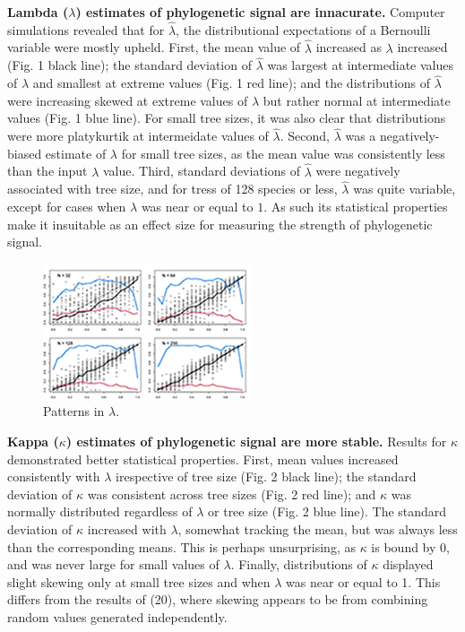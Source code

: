 \documentclass[9pt,twocolumn,twoside,lineno]{pnas-new}
\begin{document}
\textbf{Lambda (\(\lambda\)) estimates of phylogenetic signal are
innacurate.} Computer simulations revealed that for \(\hat{\lambda}\),
the distributional expectations of a Bernoulli variable were mostly
upheld. First, the mean value of \(\hat{\lambda}\) increased as
\(\lambda\) increased (Fig. 1 black line); the standard deviation of
\(\hat{\lambda}\) was largest at intermediate values of \(\lambda\) and
smallest at extreme values (Fig. 1 red line); and the distributions of
\(\hat{\lambda}\) were increasing skewed at extreme values of
\(\lambda\) but rather normal at intermediate values (Fig. 1 blue line).
For small tree sizes, it was also clear that distributions were more
platykurtik at intermeidate values of \(\hat{\lambda}\). Second,
\(\hat{\lambda}\) was a negatively-biased estimate of \(\lambda\) for
small tree sizes, as the mean value was consistently less than the input
\(\lambda\) value. Third, standard deviations of \(\hat{\lambda}\) were
negatively associated with tree size, and for tress of 128 species or
less, \(\hat{\lambda}\) was quite variable, except for cases when
\(\lambda\) was near or equal to \(1\). As such its statistical
properties make it insuitable as an effect size for measuring the
strength of phylogenetic signal.

\begin{figure}
\centering
\includegraphics{new.fig.1.temp.png}
\caption{Patterns in \(\lambda\).{}}
\end{figure}

\textbf{Kappa (\(\kappa\)) estimates of phylogenetic signal are more
stable.} Results for \(\kappa\) demonstrated better statistical
properties. First, mean values increased consistently with \(\lambda\)
irespective of tree size (Fig. 2 black line); the standard deviation of
\(\kappa\) was consistent across tree sizes (Fig. 2 red line); and
\(\kappa\) was normally distributed regardless of \(\lambda\) or tree
size (Fig. 2 blue line). The standard deviation of \(\kappa\) increased
with \(\lambda\), somewhat tracking the mean, but was always less than
the corresponding means. This is perhaps unsurprising, as \(\kappa\) is
bound by 0, and was never large for small values of \(\lambda\).
Finally, distributions of \(\kappa\) displayed slight skewing only at
small tree sizes and when \(\lambda\) was near or equal to 1. This
differs from the results of (20), where skewing appears to be from
combining random values generated independently.
\end{document}
